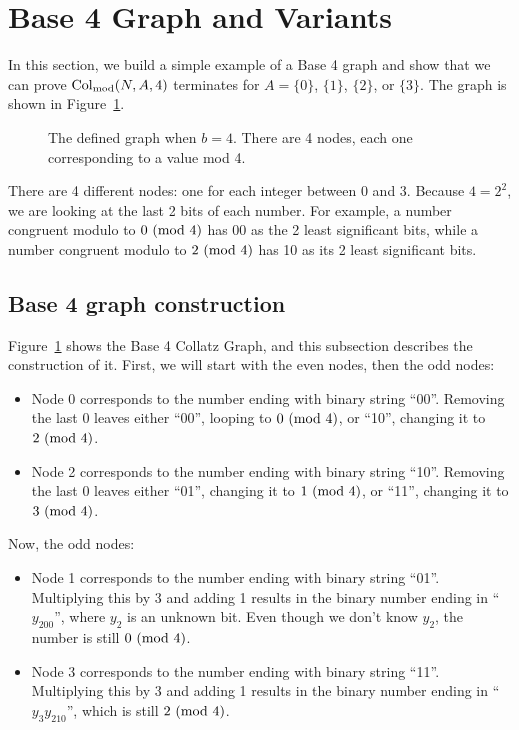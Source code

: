 \section{Base 4 Graph and Variants} \label{subsec:base4graph}
In this section, we build a simple example of a Base 4 graph and show that we can prove $\mathrm{Col}_{\text{mod}}(N,A,4)$ terminates for $A = \{0\}$, $\{1\}$, $\{2\}$, or $\{3\}$. The graph is shown in Figure~\ref{fig:base_4_graph}. \par
\begin{figure}
    \centering
    \caption{The defined graph when $b = 4$. There are 4 nodes, each one corresponding to a value mod 4.}
    \label{fig:base_4_graph}
\end{figure}
There are 4 different nodes: one for each integer between 0 and 3. Because $4 = 2^2$, we are looking at the last 2 bits of each number. For example, a number congruent modulo to $0\ (\mathrm{mod}\ 4)$ has 00 as the 2 least significant bits, while a number congruent modulo to $2\ (\mathrm{mod}\ 4)$ has 10 as its 2 least significant bits. 
\subsection{Base 4 graph construction} \label{subsubsec:proofbase4graph}
Figure~\ref{fig:base_4_graph} shows the Base 4 Collatz Graph, and this subsection describes the construction of it. First, we will start with the even nodes, then the odd nodes:
\begin{itemize}
    \item Node 0 corresponds to the number ending with binary string ``00''. Removing the last 0 leaves either ``00'', looping to $0\ (\mathrm{mod}\ 4)$, or ``10'', changing it to $2\ (\mathrm{mod}\ 4)$.
    \item Node 2 corresponds to the number ending with binary string ``10''. Removing the last 0 leaves either ``01'', changing it to $1\ (\mathrm{mod}\ 4)$, or ``11'', changing it to $3\ (\mathrm{mod}\ 4)$.
\end{itemize}
Now, the odd nodes:
\begin{itemize}
    \item Node 1 corresponds to the number ending with binary string ``01''. Multiplying this by 3 and adding 1 results in the binary number ending in ``$y_200$'', where $y_2$ is an unknown bit. Even though we don't know $y_2$, the number is still $0\ (\mathrm{mod}\ 4)$.
    \item Node 3 corresponds to the number ending with binary string ``11''. Multiplying this by 3 and adding 1 results in the binary number ending in ``$y_3y_210$'', which is still $2\ (\mathrm{mod}\ 4)$.
\end{itemize}
